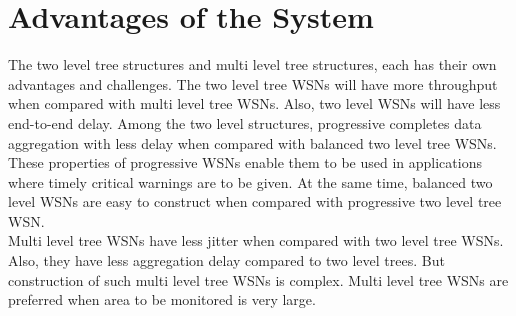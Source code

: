 \chapter{Advantages of the System}

The two level tree structures and multi level tree structures, each has their own advantages and challenges. The two level tree WSNs will have more throughput when compared with multi level tree WSNs. Also, two level WSNs will have less end-to-end delay. Among the two level structures, progressive completes data aggregation with less delay when compared with balanced two level tree WSNs. These properties of progressive WSNs enable them to be used in applications where timely critical warnings are to be given. At the same time, balanced two level WSNs are easy to construct when compared with progressive two level tree WSN.\\[1ex]

Multi level tree WSNs have less jitter when compared with two level tree WSNs. Also, they have less aggregation delay compared to two level trees. But construction of such multi level tree WSNs is complex. Multi level tree WSNs are preferred when area to be monitored is very large.\\[1ex]


	



